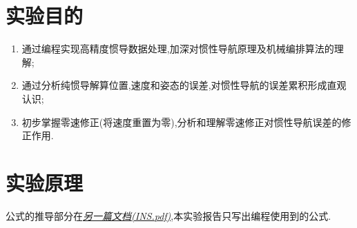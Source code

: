 \documentclass[10pt,a4paper]{ctexart}
\begin{document}


\newpage
{}
\setcounter{page}{1}
\tableofcontents


\newpage
{}
\setcounter{page}{1}

\section{实验目的}
\begin{enumerate}[nosep,label={(\arabic*)}]
\item 通过编程实现高精度惯导数据处理,加深对惯性导航原理及机械编排算法的理解;
\item 通过分析纯惯导解算位置,速度和姿态的误差,对惯性导航的误差累积形成直观认识;
\item 初步掌握零速修正(将速度重置为零),分析和理解零速修正对惯性导航误差的修正作用.
\end{enumerate}

\section{实验原理}
公式的推导部分在\href{run:./Alogrithm/INS.pdf}{\textsl{另一篇文档(INS.pdf)}},本实验报告只写出编程使用到的公式.
\end{document}
